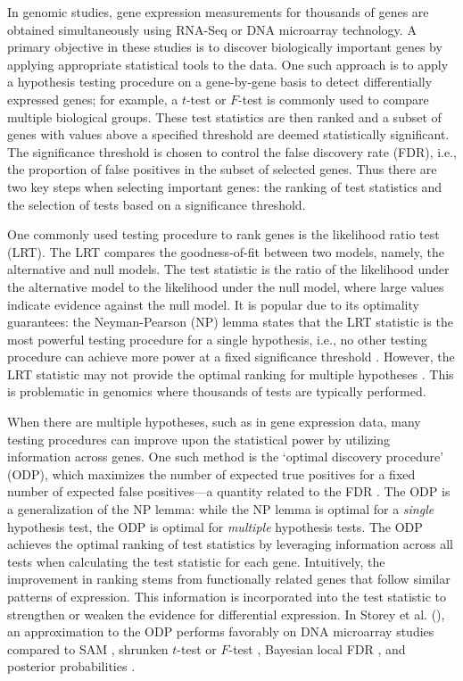 \documentclass[11pt]{article}
\begin{document}
In genomic studies, gene expression measurements for thousands of genes are obtained simultaneously using RNA-Seq or DNA microarray technology. A primary objective in these studies is to discover biologically important genes by applying appropriate statistical tools to the data. One such approach is to apply a hypothesis testing procedure on a gene-by-gene basis to detect differentially expressed genes; for example, a $t$-test or $F$-test is commonly used to compare multiple biological groups. These test statistics are then ranked and a subset of genes with values above a specified threshold are deemed statistically significant. The significance threshold is chosen to control the false discovery rate (FDR), i.e., the proportion of false positives in the subset of selected genes. Thus there are two key steps when selecting important genes: the ranking of test statistics and the selection of tests based on a significance threshold.

One commonly used testing procedure to rank genes is the likelihood ratio test (LRT). The LRT compares the goodness-of-fit between two models, namely, the alternative and null models. The test statistic is the ratio of the likelihood under the alternative model to the likelihood under the null model, where large values indicate evidence against the null model. It is popular due to its optimality guarantees: the Neyman-Pearson (NP) lemma states that the LRT statistic is the most powerful testing procedure for a single hypothesis, i.e., no other testing procedure can achieve more power at a fixed significance threshold \citep{neyman1933}. However, the LRT statistic may not provide the optimal ranking for multiple hypotheses \citep{Storey_2007_odp}. This is problematic in genomics where thousands of tests are typically performed.

When there are multiple hypotheses, such as in gene expression data, many testing procedures can improve upon the statistical power by utilizing information across genes. One such method is the `optimal discovery procedure' (ODP), which maximizes the number of expected true positives for a fixed number of expected false positives---a quantity related to the FDR \citep{Storey_2007_odp}. The ODP is a generalization of the NP lemma: while the NP lemma is optimal for a \textit{single} hypothesis test, the ODP is optimal for \textit{multiple} hypothesis tests. The ODP achieves the optimal ranking of test statistics by leveraging information across all tests when calculating the test statistic for each gene. Intuitively, the improvement in ranking stems from functionally related genes that follow similar patterns of expression. This information is incorporated into the test statistic to strengthen or weaken the evidence for differential expression. In Storey et al. (\citeyear{Storey_2006}), an approximation to the ODP performs favorably on DNA microarray studies compared to SAM \citep{tusher2001}, shrunken $t$-test or $F$-test \citep{cui2005, smyth2004linear}, Bayesian local FDR \citep{efron2001empirical}, and posterior probabilities \citep{lonnstedt2002replicated}.
\end{document}
